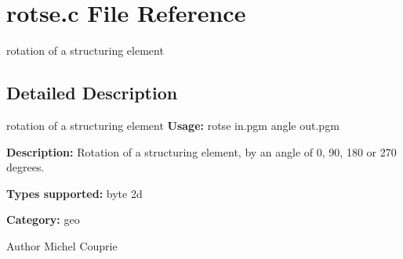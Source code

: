 \section{rotse.c File Reference}
\label{rotse_8c}


rotation of a structuring element  




\subsection{Detailed Description}
rotation of a structuring element {\bfseries Usage:} rotse in.pgm angle out.pgm

{\bfseries Description:} Rotation of a structuring element, by an angle of 0, 90, 180 or 270 degrees.

{\bfseries Types supported:} byte 2d

{\bfseries Category:} geo

\begin{DoxyAuthor}{Author}
Michel Couprie 
\end{DoxyAuthor}
